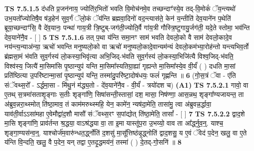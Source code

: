 \documentclass[17pt]{extarticle}
\begin{document}
                  \newline
                                \textbf{ TS 7.5.1.5} \newline
                  द॑धति प्र॒जन॑नाय॒ ज्योति॑र॒भितो॑ भवति वि॒मोच॑नमे॒व तच्छन्दाꣳ॑स्ये॒व तद्-वि॒मोकं॑ ॅय॒न्त्यथो॑ उभ॒यतो᳚ज्योतिषै॒व ष॑ड॒हेन॑ सुव॒र्गं ॅलो॒कं ॅय॑न्ति ब्रह्मवा॒दिनो॑ वद॒न्त्यास॑ते॒ केन॑ य॒न्तीति॑ देव॒याने॑न प॒थेति॑ ब्रूया॒च्छन्दाꣳ॑सि॒ वै दे॑व॒यानः॒ पन्था॑ गाय॒त्री त्रि॒ष्टुब्-जग॑ती॒ज्योति॒र्वै गा॑य॒त्री गौस्त्रि॒ष्टुगायु॒र्जग॑ती॒ यदे॒ते स्तोमा॒ भव॑न्ति देव॒याने॑नै॒व - [  ] \textbf{  5} \newline
                  \newline
                                \textbf{ TS 7.5.1.6} \newline
                  तत् प॒था य॑न्ति समा॒नꣳ साम॑ भवति देवलो॒को वै साम॑ देवलो॒कादे॒व नय॑न्त्य॒न्याअ॑न्या॒ ऋचो॑ भवन्ति मनुष्यलो॒को वा ऋचो॑ मनुष्यलो॒कादे॒वान्यम॑न्यं देवलो॒कम॑भ्या॒रोह॑न्तो यन्त्यभिव॒र्तो ब्र॑ह्मसा॒मं भ॑वति सुव॒र्गस्य॑ लो॒कस्या॒भिवृ॑त्या अभि॒जिद्-भ॑वति सुव॒र्गस्य॑ लो॒कस्या॒भिजि॑त्यै विश्व॒जिद्-भ॑वति॒ विश्व॑स्य॒ जित्यै॑ मा॒सिमा॑सि पृ॒ष्ठान्युप॑ यन्ति मा॒सिमा᳚स्यतिग्रा॒ह्या॑ गृह्यन्ते मा॒सिमा᳚स्ये॒व वी॒र्यं॑ ( ) दधति मा॒सां प्रति॑ष्ठित्या उ॒परि॑ष्टान्मा॒सां पृ॒ष्ठान्युप॑ यन्ति॒ तस्मा॑दु॒परि॑ष्टा॒दोष॑धयः॒ फलं॑ गृह्णन्ति ॥ \textbf{  6 } \newline
                  \newline
                      (गो॒स॒त्रं ॅवा - ए॑ति संॅवथ्स॒रो᳚ - ऽर्द्धमा॒सा - मि॑थु॒नं म॑द्ध्य॒तो - दे॑व॒याने॑नै॒व - वी॒र्यं॑ - त्रयो॑दश च)  \textbf{(A1)} \newline \newline
                                        \textbf{ TS 7.5.2.1} \newline
                  गावो॒ वा ए॒तथ् स॒त्रमा॑सताशृ॒ङ्गाः स॒तीः शृङ्गा॑णि॒ सिषा॑सन्ती॒स्तासां॒ दश॒ मासा॒ निष॑ण्णा॒ आस॒न्नथ॒ शृङ्गा᳚ण्यजायन्त॒ ता अ॑ब्रुव॒न्नरा॒थ्स्मोत् ति॑ष्ठा॒माव॒ तं काम॑मरुथ्स्महि॒ येन॒ कामे॑न॒ न्यष॑दा॒मेति॒ तासा॑मु॒ त्वा अ॑ब्रुवन्न॒र्द्धावा॒ याव॑ती॒र्वाऽऽसा॑महा ए॒वेमौद्वा॑द॒शौ मासौ॑ संॅवथ्स॒रꣳ स॒पांद्योत् ति॑ष्ठा॒मेति॒ तासां᳚ - [  ] \textbf{  7} \newline
                  \newline
                                \textbf{ TS 7.5.2.2} \newline
                  द्वाद॒शे मा॒सि शृङ्गा॑णि॒ प्राव॑र्तन्त श्र॒द्धया॒ वाऽश्र॑द्धया वा॒ ता इ॒मा यास्तू॑प॒रा उ॒भय्यो॒ वाव ता आ᳚र्द्ध्नुव॒न्॒. याश्च॒ शृङ्गा॒ण्यस॑न्व॒न्॒. याश्चोर्ज॑म॒वारु॑न्धत॒र्द्ध्नोति॑ द॒शसु॑ मा॒सू᳚त्तिष्ठ॑न्नृ॒द्ध्नोति॑ द्वाद॒शसु॒ य ए॒वं ॅवेद॑ प॒देन॒ खलु॒ वा ए॒ते य॑न्ति वि॒न्दति॒ खलु॒ वै प॒देन॒ यन् तद्वा ए॒तदृ॒द्धमय॑नं॒ तस्मा॑ ( ) दे॒तद्-गो॒सनि॑ ॥ \textbf{  8} \newline
\end{document}
